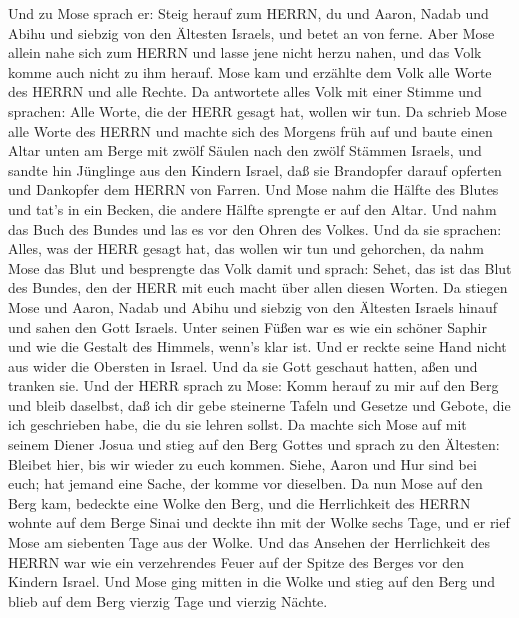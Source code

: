  Und zu Mose sprach er: Steig herauf zum HERRN, du und
Aaron, Nadab und Abihu und siebzig von den Ältesten Israels, und betet
an von ferne.  Aber Mose allein nahe sich zum HERRN und
lasse jene nicht herzu nahen, und das Volk komme auch nicht zu ihm
herauf.  Mose kam und erzählte dem Volk alle Worte des HERRN
und alle Rechte. Da antwortete alles Volk mit einer Stimme und sprachen:
Alle Worte, die der HERR gesagt hat, wollen wir tun.  Da
schrieb Mose alle Worte des HERRN und machte sich des Morgens früh auf
und baute einen Altar unten am Berge mit zwölf Säulen nach den zwölf
Stämmen Israels,  und sandte hin Jünglinge aus den Kindern
Israel, daß sie Brandopfer darauf opferten und Dankopfer dem HERRN von
Farren.  Und Mose nahm die Hälfte des Blutes und tat's in
ein Becken, die andere Hälfte sprengte er auf den Altar. 
Und nahm das Buch des Bundes und las es vor den Ohren des Volkes. Und da
sie sprachen: Alles, was der HERR gesagt hat, das wollen wir tun und
gehorchen,  da nahm Mose das Blut und besprengte das Volk
damit und sprach: Sehet, das ist das Blut des Bundes, den der HERR mit
euch macht über allen diesen Worten.  Da stiegen Mose und
Aaron, Nadab und Abihu und siebzig von den Ältesten Israels hinauf
 und sahen den Gott Israels. Unter seinen Füßen war es wie
ein schöner Saphir und wie die Gestalt des Himmels, wenn's klar ist.
 Und er reckte seine Hand nicht aus wider die Obersten in
Israel. Und da sie Gott geschaut hatten, aßen und tranken sie.
 Und der HERR sprach zu Mose: Komm herauf zu mir auf den
Berg und bleib daselbst, daß ich dir gebe steinerne Tafeln und Gesetze
und Gebote, die ich geschrieben habe, die du sie lehren sollst.
 Da machte sich Mose auf mit seinem Diener Josua und stieg
auf den Berg Gottes  und sprach zu den Ältesten: Bleibet
hier, bis wir wieder zu euch kommen. Siehe, Aaron und Hur sind bei euch;
hat jemand eine Sache, der komme vor dieselben.  Da nun
Mose auf den Berg kam, bedeckte eine Wolke den Berg,  und
die Herrlichkeit des HERRN wohnte auf dem Berge Sinai und deckte ihn mit
der Wolke sechs Tage, und er rief Mose am siebenten Tage aus der Wolke.
 Und das Ansehen der Herrlichkeit des HERRN war wie ein
verzehrendes Feuer auf der Spitze des Berges vor den Kindern Israel.
 Und Mose ging mitten in die Wolke und stieg auf den Berg
und blieb auf dem Berg vierzig Tage und vierzig Nächte.

